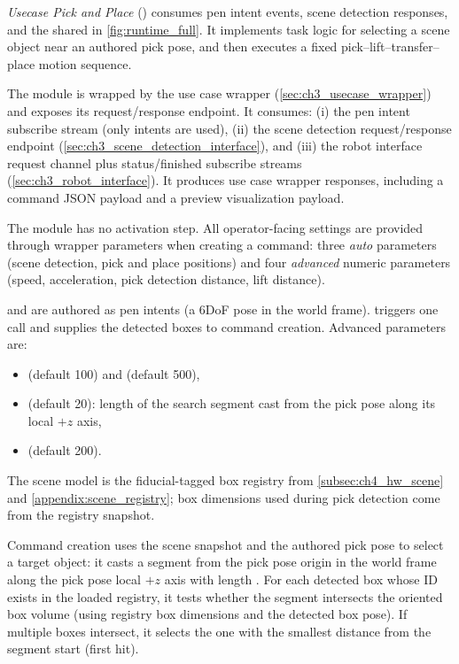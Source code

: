 \emph{Usecase Pick and Place} () consumes pen intent events, scene detection responses, and the shared  in \autoref{fig:runtime_full}. It implements task logic for selecting a scene object near an authored pick pose, and then executes a fixed pick--lift--transfer--place motion sequence.

The module is wrapped by the use case wrapper (\autoref{sec:ch3_usecase_wrapper}) and exposes its request/response endpoint.
It consumes:
(i) the pen intent subscribe stream (only  intents are used),
(ii) the scene detection request/response endpoint (\autoref{sec:ch3_scene_detection_interface}), and
(iii) the robot interface request channel plus status/finished subscribe streams (\autoref{sec:ch3_robot_interface}).
It produces use case wrapper responses, including a command JSON payload and a preview visualization payload.

The module has no activation step. All operator-facing settings are provided through wrapper parameters when creating a command:
three \emph{auto} parameters (scene detection, pick and place positions) and four \emph{advanced} numeric parameters (speed, acceleration, pick detection distance, lift distance).

 and  are authored as pen  intents (a 6DoF pose in the world frame).
 triggers one  call and supplies the detected boxes to command creation.
Advanced parameters are:
\begin{itemize}[nosep]
    \item {} (default 100) and  (default 500),
    \item {} (default 20): length of the search segment cast from the pick pose along its local $+z$ axis,
    \item {} (default 200).
\end{itemize}
The scene model is the fiducial-tagged box registry from \autoref{subsec:ch4_hw_scene} and \autoref{appendix:scene_registry}; box dimensions used during pick detection come from the registry snapshot.

Command creation uses the scene snapshot and the authored pick pose to select a target object:
it casts a segment from the pick pose origin in the world frame along the pick pose local $+z$ axis with length .
For each detected box whose ID exists in the loaded registry, it tests whether the segment intersects the oriented box volume (using registry box dimensions and the detected box pose).
If multiple boxes intersect, it selects the one with the smallest distance from the segment start (first hit).

